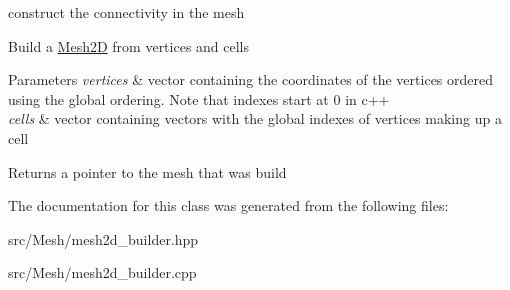 construct the connectivity in the mesh 

Build a \hyperlink{classHArDCore2D_1_1Mesh2D}{Mesh2D} from vertices and cells


\begin{DoxyParams}{Parameters}
{\em vertices} & vector containing the coordinates of the vertices ordered using the global ordering. Note that indexes start at 0 in c++ \\
\hline
{\em cells} & vector containing vectors with the global indexes of vertices making up a cell\\
\hline
\end{DoxyParams}
\begin{DoxyReturn}{Returns}
a pointer to the mesh that was build 
\end{DoxyReturn}


The documentation for this class was generated from the following files\+:\begin{DoxyCompactItemize}
\item 
src/\+Mesh/mesh2d\+\_\+builder.\+hpp\item 
src/\+Mesh/mesh2d\+\_\+builder.\+cpp\end{DoxyCompactItemize}
